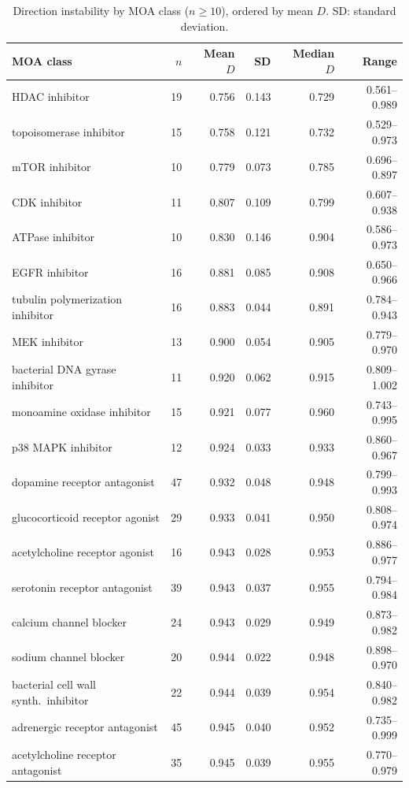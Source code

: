 \documentclass[11pt]{article}
\begin{document}
\begin{table}[h]
\centering
\caption{Direction instability by MOA class ($n \geq 10$), ordered by
mean $D$. SD: standard deviation.}
\label{tab:moa_full}
\small
\begin{tabular}{lrrrrr}
\toprule
MOA class & $n$ & Mean $D$ & SD & Median $D$ & Range \\
\midrule
HDAC inhibitor & 19 & 0.756 & 0.143 & 0.729 & 0.561--0.989 \\
topoisomerase inhibitor & 15 & 0.758 & 0.121 & 0.732 & 0.529--0.973 \\
mTOR inhibitor & 10 & 0.779 & 0.073 & 0.785 & 0.696--0.897 \\
CDK inhibitor & 11 & 0.807 & 0.109 & 0.799 & 0.607--0.938 \\
ATPase inhibitor & 10 & 0.830 & 0.146 & 0.904 & 0.586--0.973 \\
EGFR inhibitor & 16 & 0.881 & 0.085 & 0.908 & 0.650--0.966 \\
tubulin polymerization inhibitor & 16 & 0.883 & 0.044 & 0.891 & 0.784--0.943 \\
MEK inhibitor & 13 & 0.900 & 0.054 & 0.905 & 0.779--0.970 \\
bacterial DNA gyrase inhibitor & 11 & 0.920 & 0.062 & 0.915 & 0.809--1.002 \\
monoamine oxidase inhibitor & 15 & 0.921 & 0.077 & 0.960 & 0.743--0.995 \\
p38 MAPK inhibitor & 12 & 0.924 & 0.033 & 0.933 & 0.860--0.967 \\
dopamine receptor antagonist & 47 & 0.932 & 0.048 & 0.948 & 0.799--0.993 \\
glucocorticoid receptor agonist & 29 & 0.933 & 0.041 & 0.950 & 0.808--0.974 \\
acetylcholine receptor agonist & 16 & 0.943 & 0.028 & 0.953 & 0.886--0.977 \\
serotonin receptor antagonist & 39 & 0.943 & 0.037 & 0.955 & 0.794--0.984 \\
calcium channel blocker & 24 & 0.943 & 0.029 & 0.949 & 0.873--0.982 \\
sodium channel blocker & 20 & 0.944 & 0.022 & 0.948 & 0.898--0.970 \\
bacterial cell wall synth.\ inhibitor & 22 & 0.944 & 0.039 & 0.954 & 0.840--0.982 \\
adrenergic receptor antagonist & 45 & 0.945 & 0.040 & 0.952 & 0.735--0.999 \\
acetylcholine receptor antagonist & 35 & 0.945 & 0.039 & 0.955 & 0.770--0.979 \\

\end{tabular}
\end{table}
\end{document}
